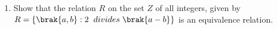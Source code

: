 \begin{enumerate}
  

\item Show that the relation $R$ on the set $Z$ of all integers, given by
$R = \{\brak{a, b} : 2\hspace{2mm} divides \hspace{1mm}\brak{a-b}\}$ is an equivalence relation.
\end{enumerate}
